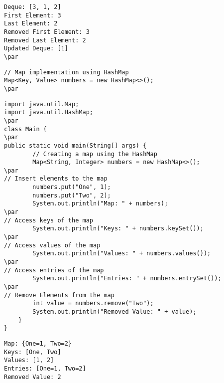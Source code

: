 \documentclass{book}
\def\lthtmlcheckvsize{\ifdim\ht\sizebox<\vsize 
  \ifdim\wd\sizebox<\hsize\expandafter\hfill\fi \expandafter\vfill
  \else\expandafter\vss\fi}%
\begin{document}
{\newpage\clearpage
{}%
\begin{lstlisting}
Deque: [3, 1, 2]
First Element: 3
Last Element: 2
Removed First Element: 3
Removed Last Element: 2
Updated Deque: [1]
\par
\end{lstlisting}%
\lthtmlfigureZ
\lthtmlcheckvsize\clearpage}

{\newpage\clearpage
{}%
\begin{lstlisting}
// Map implementation using HashMap
Map<Key, Value> numbers = new HashMap<>();
\par
\end{lstlisting}%
\lthtmlfigureZ
\lthtmlcheckvsize\clearpage}

{\newpage\clearpage
{}%
\begin{lstlisting}
import java.util.Map;
import java.util.HashMap;
\par
class Main {
\par
public static void main(String[] args) {
        // Creating a map using the HashMap
        Map<String, Integer> numbers = new HashMap<>();
\par
// Insert elements to the map
        numbers.put("One", 1);
        numbers.put("Two", 2);
        System.out.println("Map: " + numbers);
\par
// Access keys of the map
        System.out.println("Keys: " + numbers.keySet());
\par
// Access values of the map
        System.out.println("Values: " + numbers.values());
\par
// Access entries of the map
        System.out.println("Entries: " + numbers.entrySet());
\par
// Remove Elements from the map
        int value = numbers.remove("Two");
        System.out.println("Removed Value: " + value);
    }
}
\end{lstlisting}%
\lthtmlfigureZ
\lthtmlcheckvsize\clearpage}

{\newpage\clearpage
{}%
\begin{lstlisting}
Map: {One=1, Two=2}
Keys: [One, Two]
Values: [1, 2]
Entries: [One=1, Two=2]
Removed Value: 2
\end{lstlisting}%
\lthtmlfigureZ
\lthtmlcheckvsize\clearpage}
\end{document}
